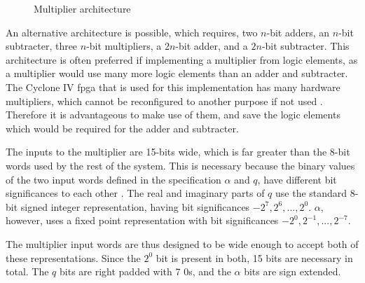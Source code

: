 \begin{figure}[ht]
	\caption{Multiplier architecture}
	\label{fig:mult-arch}
\end{figure}


An alternative architecture is possible, which requires, two $n$-bit adders, an $n$-bit subtracter, three $n$-bit multipliers, a $2n$-bit adder, and a $2n$-bit subtracter. This architecture is often preferred if implementing a multiplier from logic elements, as a multiplier would use many more logic elements than an adder and subtracter. The Cyclone IV \gls{fpga} that is used for this implementation has many hardware multipliers, which cannot be reconfigured to another purpose if not used \cite[p.4-1]{altera2016}. Therefore it is advantageous to make use of them, and save the logic elements which would be required for the adder and subtracter.

The inputs to the multiplier are 15-bits wide, which is far greater than the 8-bit words used by the rest of the system. This is necessary because the binary values of the two input words defined in the specification $\alpha$ and $q$, have different bit significances to each other \cite{kazmierski2017}. The real and imaginary parts of $q$ use the standard 8-bit signed integer representation, having bit significances $-2^7,2^6,...,2^0$. $\alpha$, however, uses a fixed point representation with bit significances $-2^0,2^{-1},...,2^{-7}$.

The multiplier input words are thus designed to be wide enough to accept both of these representations. Since the $2^0$ bit is present in both, 15 bits are necessary in total. The $q$ bits are right padded with 7 0s, and the $\alpha$ bits are sign extended.

